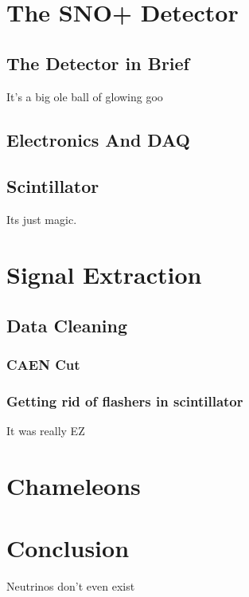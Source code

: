 \section{The SNO+ Detector}
\subsection{The Detector in Brief}
It's a big ole ball of glowing goo
\subsection{Electronics And DAQ}
\subsection{Scintillator}
Its just magic.

\section{Signal Extraction}
\subsection{Data Cleaning}
\subsubsection{CAEN Cut}
\subsubsection{Getting rid of  flashers in scintillator}
It was really EZ

\section{Chameleons}

\section{Conclusion}
Neutrinos don't even exist
